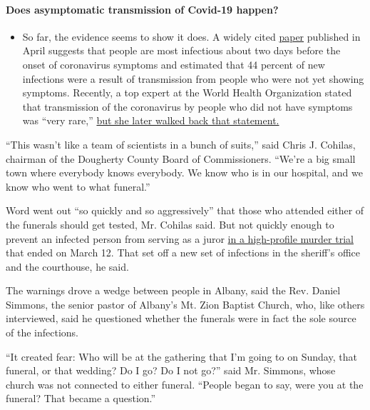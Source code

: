\begin{itemize}
{  \paragraph{Does asymptomatic transmission of Covid-19
  happen?}\label{does-asymptomatic-transmission-of-covid-19-happen}}

  \begin{itemize}
  \tightlist
  \item
    So far, the evidence seems to show it does. A widely cited
    \href{https://www.nature.com/articles/s41591-020-0869-5}{paper}
    published in April suggests that people are most infectious about
    two days before the onset of coronavirus symptoms and estimated that
    44 percent of new infections were a result of transmission from
    people who were not yet showing symptoms. Recently, a top expert at
    the World Health Organization stated that transmission of the
    coronavirus by people who did not have symptoms was ``very rare,''
    \href{https://www.nytimes.com/2020/06/09/world/coronavirus-updates.html?action=click\&pgtype=Article\&state=default\&region=MAIN_CONTENT_3\&context=storylines_faq\#link-1f302e21}{but
    she later walked back that statement.}
  \end{itemize}
\end{itemize}

``This wasn't like a team of scientists in a bunch of suits,'' said
Chris J. Cohilas, chairman of the Dougherty County Board of
Commissioners. ``We're a big small town where everybody knows everybody.
We know who is in our hospital, and we know who went to what funeral.''

Word went out ``so quickly and so aggressively'' that those who attended
either of the funerals should get tested, Mr. Cohilas said. But not
quickly enough to prevent an infected person from serving as a juror
\href{https://www.albanyherald.com/news/jurors-finish-hearing-evidence-in-august-downtown-albany-slaying/article_84f921e6-63d9-11ea-a8fa-7b42ab2ccd4f.html}{in
a high-profile murder trial} that ended on March 12. That set off a new
set of infections in the sheriff's office and the courthouse, he said.

The warnings drove a wedge between people in Albany, said the Rev.
Daniel Simmons, the senior pastor of Albany's Mt. Zion Baptist Church,
who, like others interviewed, said he questioned whether the funerals
were in fact the sole source of the infections.

``It created fear: Who will be at the gathering that I'm going to on
Sunday, that funeral, or that wedding? Do I go? Do I not go?'' said Mr.
Simmons, whose church was not connected to either funeral. ``People
began to say, were you at the funeral? That became a question.''

